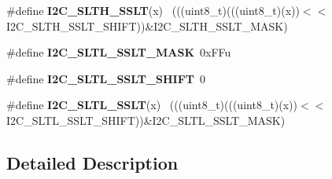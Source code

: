 \begin{DoxyCompactItemize}
\item 
\hypertarget{group___i2_c___register___masks_ga44bb9ace4180c86c1db2c2309a3af91a}{}\#define {\bfseries I2\+C\+\_\+\+S\+L\+T\+H\+\_\+\+S\+S\+L\+T}(x)                                              ~(((uint8\+\_\+t)(((uint8\+\_\+t)(x))$<$$<$I2\+C\+\_\+\+S\+L\+T\+H\+\_\+\+S\+S\+L\+T\+\_\+\+S\+H\+I\+F\+T))\&I2\+C\+\_\+\+S\+L\+T\+H\+\_\+\+S\+S\+L\+T\+\_\+\+M\+A\+S\+K)\label{group___i2_c___register___masks_ga44bb9ace4180c86c1db2c2309a3af91a}

\item 
\hypertarget{group___i2_c___register___masks_gac29118698aa1c246c26835a19210a0c9}{}\#define {\bfseries I2\+C\+\_\+\+S\+L\+T\+L\+\_\+\+S\+S\+L\+T\+\_\+\+M\+A\+S\+K}~0x\+F\+Fu\label{group___i2_c___register___masks_gac29118698aa1c246c26835a19210a0c9}

\item 
\hypertarget{group___i2_c___register___masks_ga177f38e09f29a382b35b19906462204f}{}\#define {\bfseries I2\+C\+\_\+\+S\+L\+T\+L\+\_\+\+S\+S\+L\+T\+\_\+\+S\+H\+I\+F\+T}~0\label{group___i2_c___register___masks_ga177f38e09f29a382b35b19906462204f}

\item 
\hypertarget{group___i2_c___register___masks_ga5aa875b218a0943f94bc4993eee62489}{}\#define {\bfseries I2\+C\+\_\+\+S\+L\+T\+L\+\_\+\+S\+S\+L\+T}(x)                                              ~(((uint8\+\_\+t)(((uint8\+\_\+t)(x))$<$$<$I2\+C\+\_\+\+S\+L\+T\+L\+\_\+\+S\+S\+L\+T\+\_\+\+S\+H\+I\+F\+T))\&I2\+C\+\_\+\+S\+L\+T\+L\+\_\+\+S\+S\+L\+T\+\_\+\+M\+A\+S\+K)\label{group___i2_c___register___masks_ga5aa875b218a0943f94bc4993eee62489}

\end{DoxyCompactItemize}


\subsection{Detailed Description}
